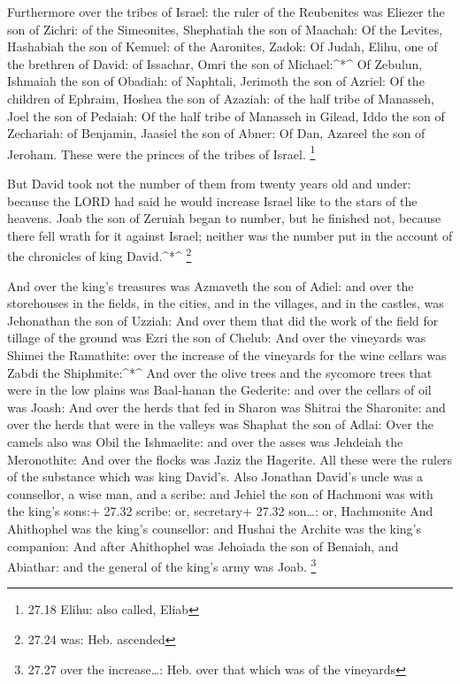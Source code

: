  Furthermore over the tribes of Israel: the ruler of the
Reubenites was Eliezer the son of Zichri: of the Simeonites, Shephatiah
the son of Maachah:  Of the Levites, Hashabiah the son of
Kemuel: of the Aaronites, Zadok:  Of Judah, Elihu, one of
the brethren of David: of Issachar, Omri the son of Michael:\^{}*\^{}
 Of Zebulun, Ishmaiah the son of Obadiah: of Naphtali,
Jerimoth the son of Azriel:  Of the children of Ephraim,
Hoshea the son of Azaziah: of the half tribe of Manasseh, Joel the son
of Pedaiah:  Of the half tribe of Manasseh in Gilead, Iddo
the son of Zechariah: of Benjamin, Jaasiel the son of Abner:
 Of Dan, Azareel the son of Jeroham. These were the princes
of the tribes of Israel. \footnote{27.18 Elihu: also called, Eliab}

 But David took not the number of them from twenty years
old and under: because the LORD had said he would increase Israel like
to the stars of the heavens.  Joab the son of Zeruiah began
to number, but he finished not, because there fell wrath for it against
Israel; neither was the number put in the account of the chronicles of
king David.\^{}*\^{} \footnote{27.24 was: Heb. ascended}

 And over the king's treasures was Azmaveth the son of
Adiel: and over the storehouses in the fields, in the cities, and in the
villages, and in the castles, was Jehonathan the son of Uzziah:
 And over them that did the work of the field for tillage
of the ground was Ezri the son of Chelub:  And over the
vineyards was Shimei the Ramathite: over the increase of the vineyards
for the wine cellars was Zabdi the Shiphmite:\^{}*\^{}  And
over the olive trees and the sycomore trees that were in the low plains
was Baal-hanan the Gederite: and over the cellars of oil was Joash:
 And over the herds that fed in Sharon was Shitrai the
Sharonite: and over the herds that were in the valleys was Shaphat the
son of Adlai:  Over the camels also was Obil the
Ishmaelite: and over the asses was Jehdeiah the Meronothite:
 And over the flocks was Jaziz the Hagerite. All these were
the rulers of the substance which was king David's.  Also
Jonathan David's uncle was a counsellor, a wise man, and a scribe: and
Jehiel the son of Hachmoni was with the king's sons:+ 27.32 scribe: or,
secretary+ 27.32 son\ldots: or, Hachmonite  And Ahithophel
was the king's counsellor: and Hushai the Archite was the king's
companion:  And after Ahithophel was Jehoiada the son of
Benaiah, and Abiathar: and the general of the king's army was Joab.
\footnote{27.27 over the increase\ldots: Heb. over that which was of the
  vineyards}

